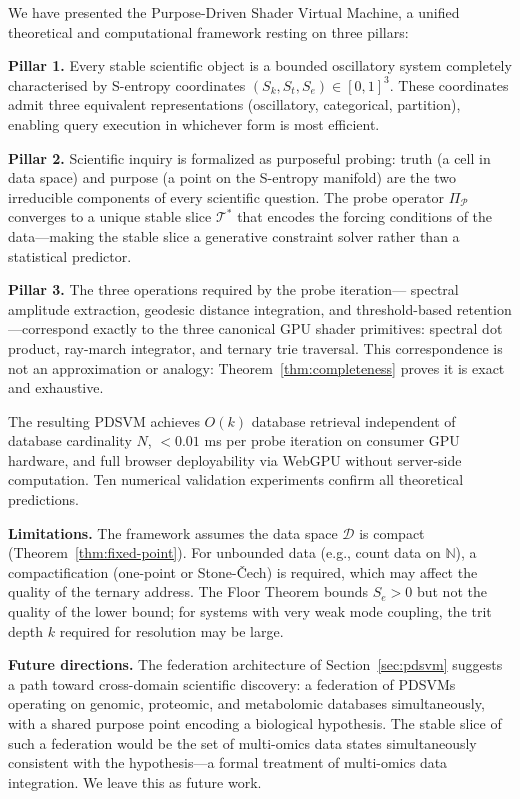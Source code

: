 \documentclass[10pt,twocolumn]{article}
\newcommand{\N}{\mathbb{N}}
\newcommand{\ProbeOp}{\Pi_\mathcal{P}}
\newcommand{\TruthCell}{\mathcal{T}}
\newcommand{\DataSpace}{\mathcal{D}}
\begin{document}
We have presented the Purpose-Driven Shader Virtual Machine, a unified
theoretical and computational framework resting on three pillars:

\textbf{Pillar 1.} Every stable scientific object is a bounded oscillatory system
completely characterised by S-entropy coordinates $(S_k, S_t, S_e) \in [0,1]^3$.
These coordinates admit three equivalent representations (oscillatory, categorical,
partition), enabling query execution in whichever form is most efficient.

\textbf{Pillar 2.} Scientific inquiry is formalized as purposeful probing:
truth (a cell in data space) and purpose (a point on the S-entropy manifold)
are the two irreducible components of every scientific question.
The probe operator $\ProbeOp$ converges to a unique stable slice $\TruthCell^*$
that encodes the forcing conditions of the data---making the stable slice
a generative constraint solver rather than a statistical predictor.

\textbf{Pillar 3.} The three operations required by the probe iteration---
spectral amplitude extraction, geodesic distance integration, and
threshold-based retention---correspond exactly to the three canonical
GPU shader primitives: spectral dot product, ray-march integrator,
and ternary trie traversal.
This correspondence is not an approximation or analogy:
Theorem~\ref{thm:completeness} proves it is exact and exhaustive.

The resulting PDSVM achieves $O(k)$ database retrieval independent of
database cardinality $N$, $< 0.01$ ms per probe iteration on consumer GPU hardware,
and full browser deployability via WebGPU without server-side computation.
Ten numerical validation experiments confirm all theoretical predictions.

\textbf{Limitations.}
The framework assumes the data space $\DataSpace$ is compact (Theorem~\ref{thm:fixed-point}).
For unbounded data (e.g., count data on $\N$), a compactification
(one-point or Stone-\v{C}ech) is required, which may affect the quality
of the ternary address.
The Floor Theorem bounds $S_e > 0$ but not the quality of the lower bound;
for systems with very weak mode coupling, the trit depth $k$ required
for resolution may be large.

\textbf{Future directions.}
The federation architecture of Section~\ref{sec:pdsvm} suggests a path toward
cross-domain scientific discovery: a federation of PDSVMs operating on
genomic, proteomic, and metabolomic databases simultaneously,
with a shared purpose point encoding a biological hypothesis.
The stable slice of such a federation would be the set of multi-omics
data states simultaneously consistent with the hypothesis---a formal
treatment of multi-omics data integration.
We leave this as future work.



\end{document}
